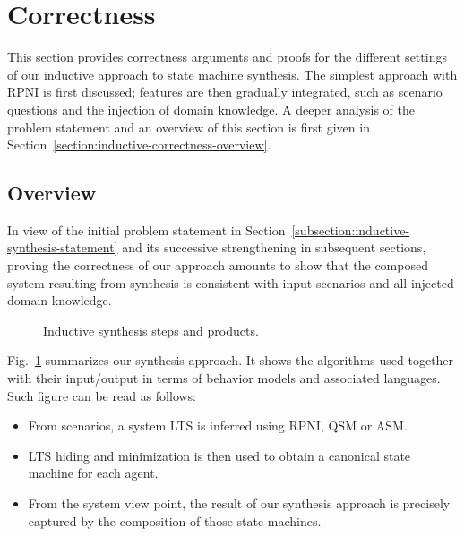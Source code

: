 \section{Correctness\label{section:inductive-correctness}}

This section provides correctness arguments and proofs for the different settings of our inductive approach to state machine synthesis. The simplest approach with RPNI is first discussed; features are then gradually integrated, such as scenario questions and the injection of domain knowledge. A deeper analysis of the problem statement and an overview of this section is first given in Section~\ref{section:inductive-correctness-overview}.

\subsection{Overview\label{section:inductive-correctness-overview}}

In view of the initial problem statement in Section~\ref{subsection:inductive-synthesis-statement} and its successive strengthening in subsequent sections, proving the correctness of our approach amounts to show that the composed system resulting from synthesis is consistent with input scenarios and all injected domain knowledge. 

\begin{figure}\centering
{}
\caption{Inductive synthesis steps and products.\label{figure:synthesis-flow-model}} 
\end{figure}

Fig.~\ref{figure:synthesis-flow-model} summarizes our synthesis approach. It shows the algorithms used together with their input/output in terms of behavior models and associated languages. Such figure can be read as follows:
\begin{itemize}
\item From scenarios, a system LTS is inferred using RPNI, QSM or ASM. 
\item LTS hiding and minimization is then used to obtain a canonical state machine for each agent. 
\item From the system view point, the result of our synthesis approach is precisely captured by the composition of those state machines.
\end{itemize}

